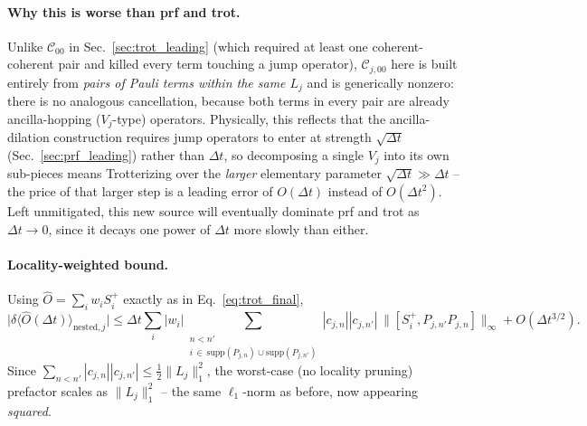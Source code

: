 \documentclass[11pt]{article}
\newcommand{\Dt}{\Delta t}
\newcommand{\calC}{\mathcal{C}}
\begin{document}
\paragraph{Why this is worse than prf and trot.} Unlike $\calC_{00}$ in Sec.~\ref{sec:trot_leading} (which required at least one coherent-coherent pair and killed every term touching a jump operator), $\calC_{j,00}$ here is built entirely from \emph{pairs of Pauli terms within the same $L_j$} and is generically nonzero: there is no analogous cancellation, because both terms in every pair are already ancilla-hopping ($V_j$-type) operators. Physically, this reflects that the ancilla-dilation construction requires jump operators to enter at strength $\sqrt{\Dt}$ (Sec.~\ref{sec:prf_leading}) rather than $\Dt$, so decomposing a single $V_j$ into its own sub-pieces means Trotterizing over the \emph{larger} elementary parameter $\sqrt{\Dt}\gg\Dt$ -- the price of that larger step is a leading error of $O(\Dt)$ instead of $O(\Dt^2)$. Left unmitigated, this new source will eventually dominate prf and trot as $\Dt\to0$, since it decays one power of $\Dt$ more slowly than either.

\paragraph{Locality-weighted bound.} Using $\hat{O}=\sum_iw_iS_i^+$ exactly as in Eq.~\eqref{eq:trot_final},
\begin{equation}\label{eq:nested_trot_final}
    \big|\delta\langle\hat{O}(\Dt)\rangle_{\text{nested},j}\big| \le \Dt\sum_i|w_i|\!\!\!\sum_{\substack{n<n'\\ i\,\in\,\mathrm{supp}(P_{j,n})\cup\mathrm{supp}(P_{j,n'})}}\!\!\!|c_{j,n}||c_{j,n'}|\,\big\|[S_i^+,P_{j,n'}P_{j,n}]\big\|_\infty + O(\Dt^{3/2}).
\end{equation}
Since $\sum_{n<n'}|c_{j,n}||c_{j,n'}|\le\tfrac12\|L_j\|_1^2$, the worst-case (no locality pruning) prefactor scales as $\|L_j\|_1^2$ -- the same $\ell_1$-norm as before, now appearing \emph{squared}.
\end{document}
